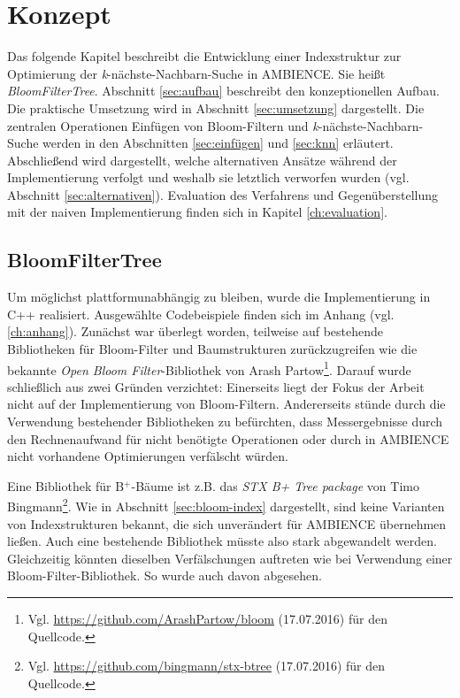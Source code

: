 \chapter{Konzept}\label{ch:implementierung}
Das folgende Kapitel beschreibt die Entwicklung einer Indexstruktur zur Optimierung der \textit{k}-nächste-Nachbarn-Suche in AMBIENCE. Sie heißt \textit{BloomFilterTree}. Abschnitt \ref{sec:aufbau} beschreibt den konzeptionellen Aufbau. Die praktische Umsetzung wird in Abschnitt \ref{sec:umsetzung} dargestellt. Die zentralen Operationen Einfügen von Bloom-Filtern und \textit{k}-nächste-Nachbarn-Suche werden in den Abschnitten \ref{sec:einfügen} und \ref{sec:knn} erläutert. Abschließend wird dargestellt, welche alternativen Ansätze während der Implementierung verfolgt und weshalb sie letztlich verworfen wurden (vgl. Abschnitt \ref{sec:alternativen}). Evaluation des Verfahrens und Gegenüberstellung mit der naiven Implementierung finden sich in Kapitel \ref{ch:evaluation}.  
\section{BloomFilterTree}\label{sec:bloom-filter-tree}
Um möglichst plattformunabhängig zu bleiben, wurde die Implementierung in C++ realisiert. Ausgewählte Codebeispiele finden sich im Anhang (vgl. \ref{ch:anhang}). Zunächst war überlegt worden, teilweise auf bestehende Bibliotheken für Bloom-Filter und Baumstrukturen zurückzugreifen wie die bekannte \textit{Open Bloom Filter}-Bibliothek von Arash Partow\footnote{Vgl. \url{https://github.com/ArashPartow/bloom} (17.07.2016) für den Quellcode.}. Darauf wurde schließlich aus zwei Gründen verzichtet: Einerseits liegt der Fokus der Arbeit nicht auf der Implementierung von Bloom-Filtern. Andererseits stünde durch die Verwendung bestehender Bibliotheken zu befürchten, dass Messergebnisse durch den Rechnenaufwand für nicht benötigte Operationen oder durch in AMBIENCE nicht vorhandene Optimierungen verfälscht würden. 

Eine Bibliothek für B$^+$-Bäume ist z.B. das \textit{STX B+ Tree package} von Timo Bingmann\footnote{Vgl. \url{https://github.com/bingmann/stx-btree} (17.07.2016) für den Quellcode.}. Wie in Abschnitt \ref{sec:bloom-index} dargestellt, sind keine Varianten von Indexstrukturen bekannt, die sich unverändert für AMBIENCE übernehmen ließen. Auch eine bestehende Bibliothek müsste also stark abgewandelt werden. Gleichzeitig könnten dieselben Verfälschungen auftreten wie bei Verwendung einer Bloom-Filter-Bibliothek. So wurde auch davon abgesehen.
